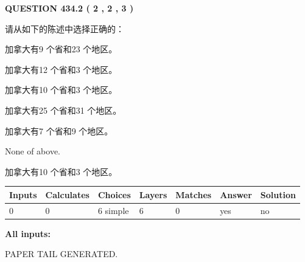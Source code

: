 \documentclass{ctexart}
\begin{document}
   
  
\vspace{0.2in}
  
{\textbf{\Large{QUESTION
434.2 
 ( 2 , 2 , 3 )
}}}
  
  
请从如下的陈述中选择正确的：
 
 
加拿大有9 个省和23 个地区。
 
 
加拿大有12 个省和3 个地区。
 
 
加拿大有10 个省和3 个地区。
 
 
加拿大有25 个省和31 个地区。
 
 
加拿大有7 个省和9 个地区。
 
 
 None of above.
 
 
\noindent{}
 
 
加拿大有10 个省和3 个地区。
 
 
\noindent{}
 
 
   
   
   
   
\noindent\begin{tabular}{|l|l|l|l|l|l|l|}
 \hline
Inputs & Calculates & Choices & Layers & Matches & Answer & Solution \\ \hline
 0  & 
 0  & 
 6
  simple  
  & 
 6  & 
 0  & 
  yes & 
  no 
  \\ \hline
 \end{tabular}
   
   
   
   
\noindent{}
   
   
   
   
\noindent\vspace{0.1in}\hspace{-0.08in} {\textbf{\Large{All inputs: }}}
   
   
   
   
   
   
 \vspace{0.2in}
 
   
   
\vspace{2.0in} PAPER TAIL GENERATED.
   
\end{document}
